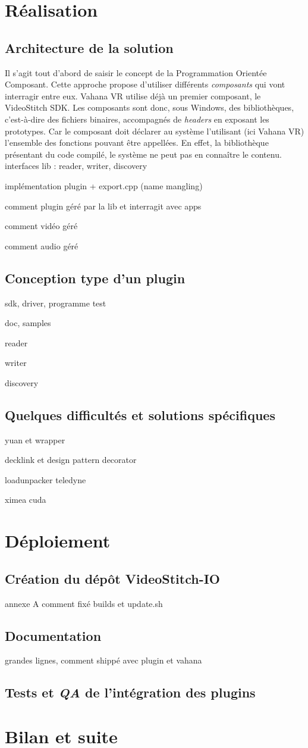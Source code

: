 \section{Réalisation}
\subsection{Architecture de la solution}
Il s'agit tout d'abord de saisir le concept de la Programmation Orientée Composant. 
Cette approche propose d'utiliser différents \emph{composants} qui vont interragir
entre eux. Vahana VR utilise déjà un premier composant, le VideoStitch SDK.
Les composants sont donc, sous Windows, des bibliothèques, c'est-à-dire des fichiers binaires,
accompagnés de \textit{headers} en exposant les prototypes. Car le composant doit
déclarer au système l'utilisant (ici Vahana VR) l'ensemble des fonctions pouvant être
appellées. En effet, la bibliothèque présentant du code compilé, le système ne peut 
pas en connaître le contenu.\cite{poc}\\

interfaces lib : reader, writer, discovery

implémentation plugin + export.cpp (name mangling)

comment plugin géré par la lib et interragit avec apps

comment vidéo géré

comment audio géré

\subsection{Conception type d'un plugin}
sdk, driver, programme test

doc, samples

reader

writer

discovery

\subsection{Quelques difficultés et solutions spécifiques}
yuan et wrapper

decklink et design pattern decorator

loadunpacker teledyne

ximea cuda


\section{Déploiement}
\subsection{Création du dépôt VideoStitch-IO}
annexe A
comment fixé builds et update.sh

\subsection{Documentation}
grandes lignes, comment shippé avec plugin et vahana

\subsection{Tests et \textit{QA} de l'intégration des plugins}


\section{Bilan et suite}

